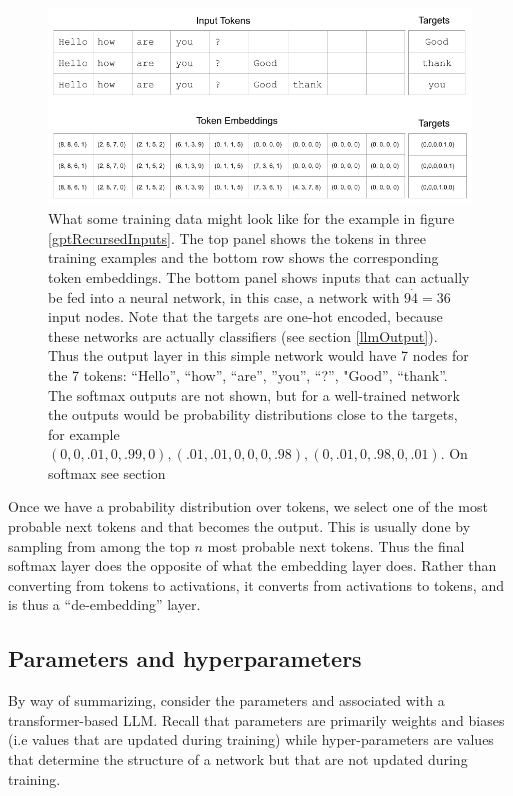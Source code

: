 \begin{figure}[h]
\centering
\includegraphics[scale=.45]{./images/contextWindow.png}
\caption[Jeff Yoshimi]{What some training data might look like for the example in figure \ref{gptRecursedInputs}. The top panel shows the tokens in three training examples and the bottom row shows the corresponding token embeddings. The bottom panel shows inputs that can actually be fed into a neural network, in this case, a network with $9 \dot 4 = 36$ input nodes. Note that the targets are one-hot encoded, because these networks are actually classifiers (see section \ref{llmOutput}). Thus the output layer in this simple network would have 7 nodes for the 7 tokens: ``Hello'', ``how'', ``are'', ''you'', ``?'', "Good'', ``thank''. The softmax outputs are not shown, but for a well-trained network the outputs would be probability distributions close to the targets, for example $(0,0,.01,0,.99,0),  (.01,.01,0,0,0,.98), (0,.01,0,.98,0,.01)$. On softmax see section }
\label{contextWindow}
\end{figure}

Once we have a probability distribution over tokens, we select one of the most probable next tokens and that becomes the output. This is usually done by sampling from among the top $n$ most probable next tokens. Thus the final softmax layer does the opposite of what the embedding layer does. Rather than converting from tokens to activations, it converts from activations to tokens, and is thus a ``de-embedding'' layer.

\subsection{Parameters and hyperparameters}

By way of summarizing, consider the parameters and   associated with a transformer-based LLM. Recall that parameters are primarily weights and biases (i.e values that are updated during training) while hyper-parameters are values that determine the structure of a network but that are not updated during training.

